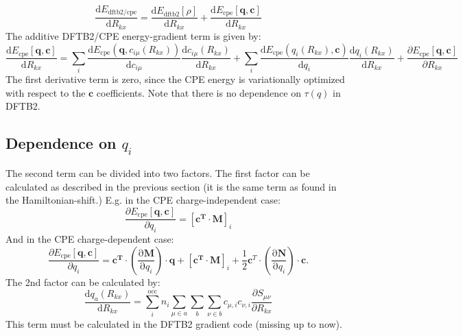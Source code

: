 \documentclass{article}
\numberwithin{equation}{section}
\begin{document}
\begin{equation}
    \frac{\mathrm{d} E_\mathrm{dftb2/cpe}}{\mathrm{d} R_{kx}} = \frac{\mathrm{d} E_\mathrm{{dftb2}}\left[ \rho \right]}{\mathrm{d} R_{kx}} + \frac{\mathrm{d} E_\mathrm{{cpe}}\left[\mathbf{q}, \mathbf{c}\right]}{\mathrm{d} R_{kx}}
\label{eq:dftb2cpe_derivative}
\end{equation}
The additive DFTB2/CPE energy-gradient term is given by:
\begin{equation}
    \frac{\mathrm{d} E_\mathrm{{cpe}}\left[\mathbf{q}, \mathbf{c}\right]}{\mathrm{d} R_{kx}} 
    = \sum_i \frac{\mathrm{d} E_\mathrm{{cpe}}\left(\mathbf{q}, c_{i\mu}(R_{kx})\right)}{\mathrm{d} c_{i\mu}}    
        \frac{\mathrm{d} c_{i\mu}(R_{kx})}{\mathrm{d} R_{kx}} 
    + \sum_i \frac{\mathrm{d} E_\mathrm{{cpe}}\left(q_i(R_{kx}), \mathbf{c}\right)}{\mathrm{d} q_i}    
        \frac{\mathrm{d} q_i(R_{kx})}{\mathrm{d} R_{kx}} 
    + \frac{\partial E_\mathrm{{cpe}}\left[\mathbf{q}, \mathbf{c}\right]}{\partial R_{kx}}
\end{equation}
The first derivative term is zero, since the CPE energy is variationally optimized with respect to the $\mathbf{c}$ coefficients. Note that there is no dependence on $\tau(q)$ in DFTB2. %
\subsection{Dependence on $q_i$}
The second term can be divided into two factors. The first factor can be calculated as described in the previous section (it is the same term as found in the Hamiltonian-shift.) 
E.g. in the CPE charge-independent case:
\begin{equation}
    \frac{\partial E_{\mathrm{cpe}}\left[\mathbf{q}, \mathbf{c}\right]}{\partial q_i} = [\mathbf{c^T}  \cdot \mathbf{M}]_i
\end{equation}
And in the CPE charge-dependent case:
\begin{equation}
    \frac{\partial E_{\mathrm{cpe}}\left[\mathbf{q}, \mathbf{c}\right]}{\partial q_i} = 
    \mathbf{c^T} \cdot \left( \frac{\mathrm{\partial}\mathbf{M}}{\mathrm{\partial}q_i}\right) \cdot \mathbf{q} 
    + [\mathbf{c^T}  \cdot \mathbf{M}]_i + \frac{1}{2}\mathbf{c}^T \cdot \left( \frac{\mathrm{\partial}\mathbf{N}}{\mathrm{\partial}q_i}\right) \cdot \mathbf{c}. 
\end{equation}
The 2nd factor can be calculated by:
\begin{equation}
    \frac{\mathrm{d} q_a(R_{kx})}{\mathrm{d} R_{kx}} 
    = \sum_i^\mathrm{occ} n_i \sum_{\mu \in a} \sum_b \sum_{\nu \in b}
    c_{\mu,i} c_{\nu,i}\frac{\partial S_{\mu\nu}}{\partial R_{kx}}
\end{equation}
This term must be calculated in the DFTB2 gradient code (missing up to now). 
\end{document}
